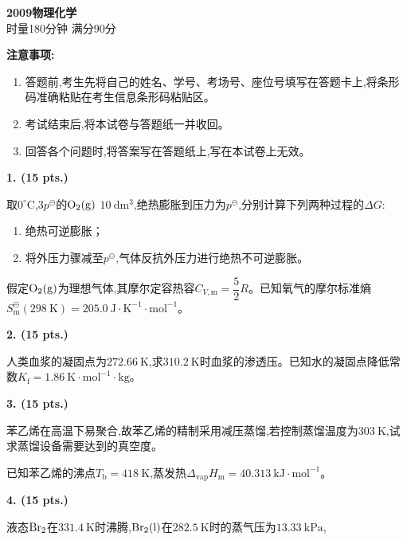 \begin{center}
    {\LARGE \textbf{2009物理化学}} \\[2ex]
    {\large 时量180分钟 \quad 满分90分}
\end{center}

\vspace{0.5cm}
\noindent\textbf{注意事项:}
\begin{enumerate}[label=\arabic*., parsep=0pt, itemsep=0pt]
    \item 答题前,考生先将自己的姓名、学号、考场号、座位号填写在答题卡上,将条形码准确粘贴在考生信息条形码粘贴区。
    \item 考试结束后,将本试卷与答题纸一并收回。
    \item 回答各个问题时,将答案写在答题纸上,写在本试卷上无效。
\end{enumerate}

\vspace{0.5cm}
\noindent\textbf{1. (15 pts.)}

取$0^\circ\mathrm{C}$,$3p^\ominus$的$\ce{O_{2}(g)}$ $10\ \mathrm{dm^3}$,绝热膨胀到压力为$p^\ominus$,分别计算下列两种过程的$\Delta G$:
\begin{enumerate}[label=(\arabic*), itemsep=1ex]
    \item 绝热可逆膨胀；
    \item 将外压力骤减至$p^\ominus$,气体反抗外压力进行绝热不可逆膨胀。
\end{enumerate}
假定$\ce{O_{2}(g)}$为理想气体,其摩尔定容热容$C_{V,\mathrm{m}}=\dfrac{5}{2}R$。已知氧气的摩尔标准熵$S_\mathrm{m}^\ominus(298\ \mathrm{K})=205.0\ \mathrm{J\cdot K^{-1}\cdot mol^{-1}}$。

\vspace{0.5cm}
\noindent\textbf{2. (15 pts.)}

人类血浆的凝固点为$272.66\ \mathrm{K}$,求$310.2\ \mathrm{K}$时血浆的渗透压。已知水的凝固点降低常数$K_\mathrm{f}=1.86\ \mathrm{K\cdot mol^{-1}\cdot kg}$。

\vspace{0.5cm}
\noindent\textbf{3. (15 pts.)}

苯乙烯在高温下易聚合,故苯乙烯的精制采用减压蒸馏,若控制蒸馏温度为$303\ \mathrm{K}$,试求蒸馏设备需要达到的真空度。

已知苯乙烯的沸点$T_\mathrm{b}=418\ \mathrm{K}$,蒸发热$\Delta_\mathrm{vap}H_\mathrm{m}=40.313\ \mathrm{kJ\cdot mol^{-1}}$。

\vspace{0.5cm}
\noindent\textbf{4. (15 pts.)}

液态$\ce{Br_{2}}$在$331.4\ \mathrm{K}$时沸腾,$\ce{Br_{2}(l)}$在$282.5\ \mathrm{K}$时的蒸气压为$13.33\ \mathrm{kPa}$,

